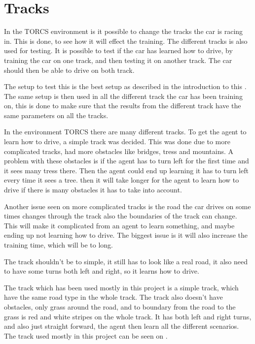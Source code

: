 \section{Tracks}
In the TORCS environment is it possible to change the tracks the car is racing in. This is done, to see how it will effect the training. The different tracks is also used for testing. It is possible to test if the car has learned how to drive, by training the car on one track, and then testing it on another track. The car should then be able to drive on both track.  

The setup to test this is the best setup as described in the introduction to this . The same setup is then used in all the different track the car has been training on, this is done to make sure that the results from the different track have the same parameters on all the tracks. 

In the environment TORCS there are many different tracks. To get the agent to learn how to drive, a simple track was decided. This was done due to more complicated tracks, had more obstacles like bridges, tress and mountains. A problem with these obstacles is if the agent has to turn left for the first time and it sees many tress there. Then the agent could end up learning it has to turn left every time it sees a tree. then it will take longer for the agent to learn how to drive if there is many obstacles it has to take into account. 

Another issue seen on more complicated tracks is the road the car drives on some times changes through the track also the boundaries of the track can change. This will make it complicated from an agent to learn something, and maybe ending up not learning how to drive. The biggest issue is it will also increase the training time, which will be to long. 

The track shouldn't be to simple, it still has to look like a real road, it also need to have some turns both left and right, so it learns how to drive. 

The track which has been used mostly in this project is a simple track, which have the same road type in the whole track. The track also doesn't have obstacles, only grass around the road, and to boundary from the road to the grass is red and white stripes on the whole track. It has both left and right turns, and also just straight forward, the agent then learn all the different scenarios. The track used mostly in this project can be seen on .

